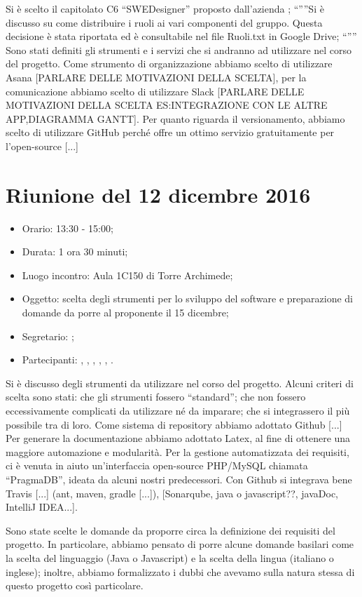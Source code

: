 Si è scelto il capitolato C6 “SWEDesigner” proposto dall'azienda \ZU; 
“””Si è discusso su come distribuire i ruoli ai vari componenti del gruppo. Questa decisione è stata riportata ed è consultabile nel file Ruoli.txt in Google Drive; “””
Sono stati definiti gli strumenti e i servizi che si andranno ad utilizzare nel corso del progetto. Come strumento di organizzazione abbiamo scelto di utilizzare Asana [PARLARE DELLE MOTIVAZIONI DELLA SCELTA], per la comunicazione abbiamo scelto di utilizzare Slack [PARLARE DELLE MOTIVAZIONI DELLA SCELTA ES:INTEGRAZIONE CON LE ALTRE APP,DIAGRAMMA GANTT]. Per quanto riguarda il versionamento, abbiamo scelto di utilizzare GitHub perché offre un ottimo servizio gratuitamente per l'open-source [...]



\section{Riunione del 12 dicembre 2016}

\begin{itemize}
	\item Orario: 13:30 - 15:00;
	\item Durata: 1 ora 30 minuti;
	\item Luogo incontro: Aula 1C150 di Torre Archimede; 
	\item Oggetto: scelta degli strumenti per lo sviluppo del software e preparazione di domande da porre al proponente il 15 dicembre;
	\item Segretario: \PB; 
	\item Partecipanti: \AZ, \GG, \LB, \LS, \MM, \PB.
\end{itemize}

Si è discusso degli strumenti da utilizzare nel corso del progetto. Alcuni criteri di scelta sono stati: che gli strumenti fossero “standard”; che non fossero eccessivamente complicati da utilizzare né da imparare; che si integrassero il più possibile tra di loro. Come sistema di repository abbiamo adottato Github [...] Per generare la documentazione abbiamo adottato Latex, al fine di ottenere una maggiore automazione e modularità. Per la gestione automatizzata dei requisiti, ci è venuta in aiuto un'interfaccia open-source PHP/MySQL chiamata “PragmaDB”, ideata da alcuni nostri predecessori. Con Github si integrava bene Travis [...] (ant, maven, gradle [...]), [Sonarqube, java o javascript??, javaDoc, IntelliJ IDEA...].

Sono state scelte le domande da proporre circa la definizione dei requisiti del progetto. In particolare, abbiamo pensato di porre alcune domande basilari come la scelta del linguaggio (Java o Javascript) e la scelta della lingua (italiano o inglese); inoltre, abbiamo formalizzato i dubbi che avevamo sulla natura stessa di questo progetto così particolare.



